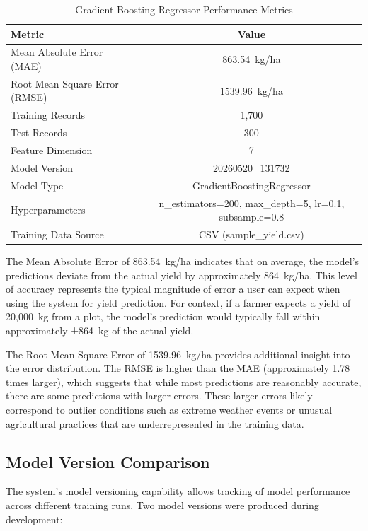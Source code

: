 \begin{table}[H]
\centering
\caption{Gradient Boosting Regressor Performance Metrics}
\label{tab:model-metrics}
\begin{tabular}{lc}
\toprule
\textbf{Metric} & \textbf{Value} \\
\midrule
Mean Absolute Error (MAE) & 863.54~kg/ha \\
Root Mean Square Error (RMSE) & 1539.96~kg/ha \\
Training Records & 1,700 \\
Test Records & 300 \\
Feature Dimension & 7 \\
Model Version & 20260520\_131732 \\
Model Type & GradientBoostingRegressor \\
Hyperparameters & n\_estimators=200, max\_depth=5, lr=0.1, subsample=0.8 \\
Training Data Source & CSV (sample\_yield.csv) \\
\bottomrule
\end{tabular}
\end{table}

The Mean Absolute Error of 863.54~kg/ha indicates that on average, the model's predictions deviate from the actual yield by approximately 864~kg/ha. This level of accuracy represents the typical magnitude of error a user can expect when using the system for yield prediction. For context, if a farmer expects a yield of 20,000~kg from a plot, the model's prediction would typically fall within approximately ±864~kg of the actual yield.

The Root Mean Square Error of 1539.96~kg/ha provides additional insight into the error distribution. The RMSE is higher than the MAE (approximately 1.78 times larger), which suggests that while most predictions are reasonably accurate, there are some predictions with larger errors. These larger errors likely correspond to outlier conditions such as extreme weather events or unusual agricultural practices that are underrepresented in the training data.

\subsection{Model Version Comparison}

The system's model versioning capability allows tracking of model performance across different training runs. Two model versions were produced during development:

